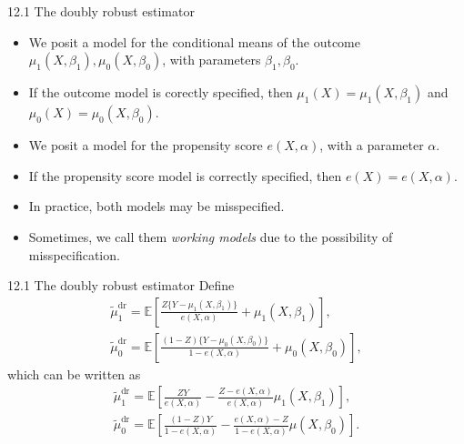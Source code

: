 \documentclass[aspectratio=169, 12pt]{beamer}
\newcommand{\E}{\mathbb{E}}
\begin{document}
\begin{frame}{12.1 The doubly robust estimator}
  \begin{itemize}
    \item We posit a model for the conditional means of the outcome $\mu_1(X,\beta_1),\mu_0(X,\beta_0)$, with parameters $\beta_1,\beta_0$.
    \item If the outcome model is corectly specified, then $\mu_1(X)=\mu_1(X,\beta_1)$ and $\mu_0(X)=\mu_0(X,\beta_0)$.
    \item We posit a model for the propensity score $e(X,\alpha)$, with a parameter $\alpha$.
    \item If the propensity score model is correctly specified, then $e(X)=e(X,\alpha)$.
    \item In practice, both models may be misspecified.
    \item Sometimes, we call them \textit{working models} due to the possibility of misspecification.
  \end{itemize}
\end{frame}

\begin{frame}{12.1 The doubly robust estimator}
  Define
  \begin{gather}
    \tilde{\mu}_1^{\text{dr}} = \E\left[\frac{Z\{Y-\mu_1(X,\beta_1)\}}{e(X,\alpha)}+\mu_1(X,\beta_1)\right],\label{eq:dr-outcome-1}\\
    \tilde{\mu}_0^{\text{dr}} = \E\left[\frac{(1-Z)\{Y-\mu_0(X,\beta_0)\}}{1-e(X,\alpha)}+\mu_0(X,\beta_0)\right],\label{eq:dr-outcome-0}
  \end{gather}
  which can be written as
  \begin{gather}
    \tilde{\mu}_1^{\text{dr}} = \E\left[\frac{ZY}{e(X,\alpha)}-\frac{Z-e(X,\alpha)}{e(X,\alpha)}\mu_1(X,\beta_1)\right],\label{eq:dr-ipw-1}\\
    \tilde{\mu}_0^{\text{dr}} = \E\left[\frac{(1-Z)Y}{1-e(X,\alpha)}-\frac{e(X,\alpha)-Z}{1-e(X,\alpha)}\mu(X,\beta_0)\right].\label{eq:dr-ipw-0}
  \end{gather}
\end{frame}
\end{document}
